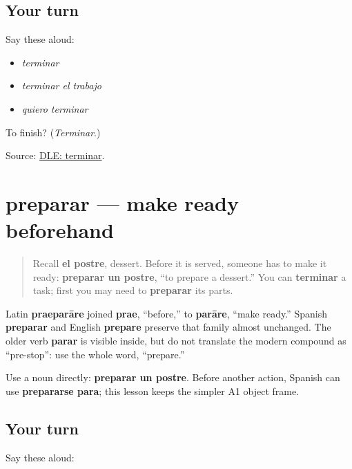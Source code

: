 \subsection*{Your turn}
Say these aloud:

\begin{itemize}
\raggedright
  \item \emph{terminar}
  \item \emph{terminar el trabajo}
  \item \emph{quiero terminar}
\end{itemize}

\begin{tcolorbox}[breakable,colback=teal!4,colframe=teal!35!black,title={Before you move on}]
To finish? (\emph{Terminar}.)

Source: \href{https://dle.rae.es/terminar}{DLE: terminar}.
\end{tcolorbox}
\section[preparar]{preparar — make ready beforehand}

\label{lesson:ES-C409-preparar}



\begin{quote}
Recall \textbf{el postre}, dessert. Before it is served, someone has to make it ready: \textbf{preparar un postre}, “to prepare a dessert.” You can \textbf{terminar} a task; first you may need to \textbf{preparar} its parts.
\end{quote}

\begin{cousinweb}
Latin \textbf{praeparāre} joined \textbf{prae}, “before,” to \textbf{parāre}, “make ready.” Spanish \textbf{preparar} and English \textbf{prepare} preserve that family almost unchanged. The older verb \textbf{parar} is visible inside, but do not translate the modern compound as “pre-stop”: use the whole word, “prepare.”
\end{cousinweb}

\begin{grammarlens}[title={Grammar Lens: prepare a thing or prepare to act}]
Use a noun directly: \textbf{preparar un postre}. Before another action, Spanish can use \textbf{prepararse para}; this lesson keeps the simpler A1 object frame.
\end{grammarlens}

\subsection*{Your turn}
Say these aloud:


